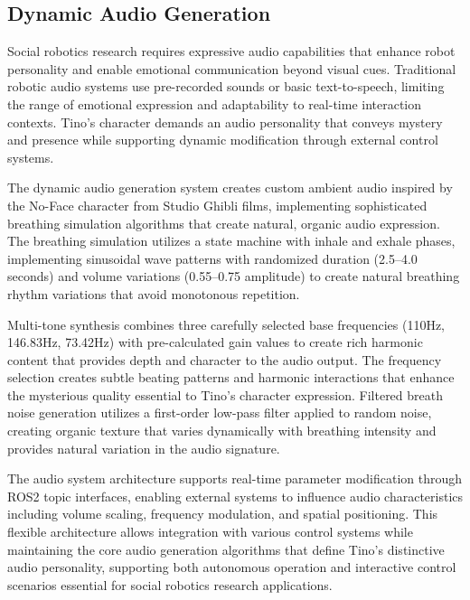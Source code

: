 \subsection{Dynamic Audio Generation}

Social robotics research requires expressive audio capabilities that enhance robot personality and enable emotional communication beyond visual cues. Traditional robotic audio systems use pre-recorded sounds or basic text-to-speech, limiting the range of emotional expression and adaptability to real-time interaction contexts. Tino's character demands an audio personality that conveys mystery and presence while supporting dynamic modification through external control systems.

The dynamic audio generation system creates custom ambient audio inspired by the No-Face character from Studio Ghibli films, implementing sophisticated breathing simulation algorithms that create natural, organic audio expression. The breathing simulation utilizes a state machine with inhale and exhale phases, implementing sinusoidal wave patterns with randomized duration (2.5--4.0 seconds) and volume variations (0.55--0.75 amplitude) to create natural breathing rhythm variations that avoid monotonous repetition.

Multi-tone synthesis combines three carefully selected base frequencies (110Hz, 146.83Hz, 73.42Hz) with pre-calculated gain values to create rich harmonic content that provides depth and character to the audio output. The frequency selection creates subtle beating patterns and harmonic interactions that enhance the mysterious quality essential to Tino's character expression. Filtered breath noise generation utilizes a first-order low-pass filter applied to random noise, creating organic texture that varies dynamically with breathing intensity and provides natural variation in the audio signature.

The audio system architecture supports real-time parameter modification through ROS2 topic interfaces, enabling external systems to influence audio characteristics including volume scaling, frequency modulation, and spatial positioning. This flexible architecture allows integration with various control systems while maintaining the core audio generation algorithms that define Tino's distinctive audio personality, supporting both autonomous operation and interactive control scenarios essential for social robotics research applications.

